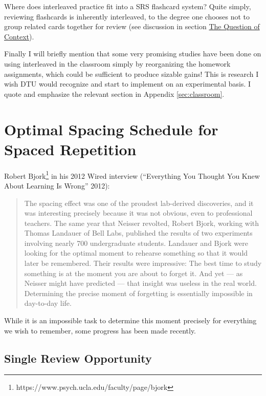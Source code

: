 Where does interleaved practice fit into a SRS flashcard system? Quite
simply, reviewing flashcards is inherently interleaved, to the degree
one chooses not to group related cards together for review (see
discussion in section \protect\hyperlink{the-question-of-context}{The
Question of Context}).

Finally I will briefly mention that some very promising studies have
been done on using interleaved in the classroom simply by reorganizing
the homework assignments, which could be sufficient to produce sizable
gains! This is research I wish DTU would recognize and start to
implement on an experimental basis. I quote and emphasize the relevant
section in Appendix \ref{sec:classroom}.

\pagebreak

\hypertarget{optimal-spacing-schedule-for-spaced-repetition}{\section{Optimal
Spacing Schedule for Spaced
Repetition}\label{optimal-spacing-schedule-for-spaced-repetition}}

Robert Bjork\footnote{https://www.psych.ucla.edu/faculty/page/bjork} in
his 2012 Wired interview (``Everything You Thought You Knew About
Learning Is Wrong'' 2012):

\begin{quote}
The spacing effect was one of the proudest lab-derived discoveries, and
it was interesting precisely because it was not obvious, even to
professional teachers. The same year that Neisser revolted, Robert
Bjork, working with Thomas Landauer of Bell Labs, published the results
of two experiments involving nearly 700 undergraduate students. Landauer
and Bjork were looking for the optimal moment to rehearse something so
that it would later be remembered. Their results were impressive: The
best time to study something is at the moment you are about to forget
it. And yet --- as Neisser might have predicted --- that insight was
useless in the real world. Determining the precise moment of forgetting
is essentially impossible in day-to-day life.
\end{quote}

While it is an impossible task to determine this moment precisely for
everything we wish to remember, some progress has been made recently.

\subsection{Single Review Opportunity}\label{single-review-opportunity}

